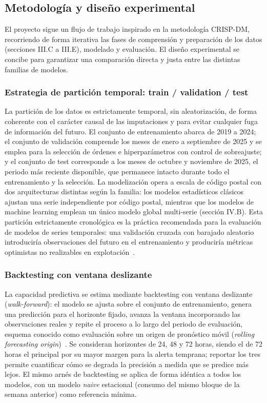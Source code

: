 \documentclass[12pt, a4paper]{article}
\begin{document}
\subsection{Metodología y diseño experimental}


El proyecto sigue un flujo de trabajo inspirado en la metodología CRISP-DM, recorriendo de forma iterativa las fases de comprensión y preparación de los datos (secciones III.C a III.E), modelado y evaluación. El diseño experimental se concibe para garantizar una comparación directa y justa entre las distintas familias de modelos.

\subsubsection{Estrategia de partición temporal: train / validation / test}


La partición de los datos es estrictamente temporal, sin aleatorización, de forma coherente con el carácter causal de las imputaciones y para evitar cualquier fuga de información del futuro. El conjunto de entrenamiento abarca de 2019 a 2024; el conjunto de validación comprende los meses de enero a septiembre de 2025 y se emplea para la selección de órdenes e hiperparámetros con control de sobreajuste; y el conjunto de test corresponde a los meses de octubre y noviembre de 2025, el periodo más reciente disponible, que permanece intacto durante todo el entrenamiento y la selección. La modelización opera a escala de código postal con dos arquitecturas distintas según la familia: los modelos estadísticos clásicos ajustan una serie independiente por código postal, mientras que los modelos de machine learning emplean un único modelo global multi-serie (sección IV.B). Esta partición estrictamente cronológica es la práctica recomendada para la evaluación de modelos de series temporales: una validación cruzada con barajado aleatorio introduciría observaciones del futuro en el entrenamiento y produciría métricas optimistas no realizables en explotación~\cite{hyndman2021}.

\subsubsection{Backtesting con ventana deslizante}


La capacidad predictiva se estima mediante backtesting con ventana deslizante (\textit{walk-forward}): el modelo se ajusta sobre el conjunto de entrenamiento, genera una predicción para el horizonte fijado, avanza la ventana incorporando las observaciones reales y repite el proceso a lo largo del periodo de evaluación, esquema conocido como evaluación sobre un origen de pronóstico móvil (\textit{rolling forecasting origin})~\cite{hyndman2021}. Se consideran horizontes de 24, 48 y 72 horas, siendo el de 72 horas el principal por su mayor margen para la alerta temprana; reportar los tres permite cuantificar cómo se degrada la precisión a medida que se predice más lejos. El mismo arnés de backtesting se aplica de forma idéntica a todos los modelos, con un modelo \textit{naive} estacional (consumo del mismo bloque de la semana anterior) como referencia mínima.
\end{document}
